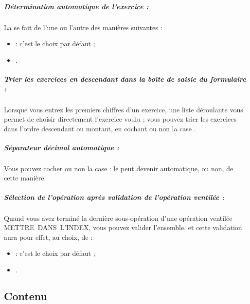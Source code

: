 \subparagraph{Détermination automatique de l'exercice :\label{setup-form-behaviour-financialyear}}

La  se fait de l'une ou l'autre des manières suivantes :

\begin{itemize}
	\item {} : c'est le choix par défaut ;
	\item {}.
\end{itemize}



\subparagraph{Trier les exercices en descendant dans la boîte de saisie du formulaire :\label{setup-form-behaviour-sort}}

Lorsque vous entrez les premiers chiffres d'un exercice, une liste déroulante vous permet de choisir directement l'exercice voulu ; vous pouvez trier les exercices dans l'ordre descendant ou montant, en cochant ou non la case .
	
\subparagraph{Séparateur décimal automatique :\label{setup-form-behaviour-decimal}}

Vous pouvez cocher ou non la case  : le  peut devenir automatique, ou non, de cette manière.


\subparagraph{Sélection de l'opération après validation de l'opération ventilée :\label{setup-form-behaviour-selection}}

Quand vous avez terminé la dernière sous-opération d'une opération ventilée METTRE DANS L'INDEX, vous pouvez valider l'ensemble, et cette validation aura pour effet, au choix, de :

\begin{itemize}
	\item {} : c'est le choix par défaut ;
	\item {}.
\end{itemize}




\subsection{Contenu\label{setup-form-content}}

